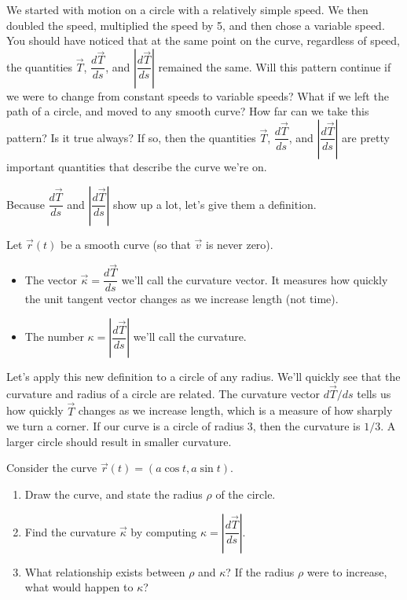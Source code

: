 We started with motion on a circle with a relatively simple speed.  We then doubled the speed, multiplied the speed by 5, and then chose a variable speed.  You should have noticed that at the same point on the curve, regardless of speed, the quantities $\vec T$, $\dfrac{d\vec T}{ds}$, and $\left|\dfrac{d\vec T}{ds}\right|$ remained the same. Will this pattern continue if we were to change from constant speeds to variable speeds?  What if we left the path of a circle, and moved to any smooth curve? How far can we take this pattern?  Is it true always?  If so, then the quantities $\vec T$, $\dfrac{d\vec T}{ds}$, and $\left|\dfrac{d\vec T}{ds}\right|$ are pretty important quantities that describe the curve we're on. 

Because $\dfrac{d\vec T}{ds}$ and $\left|\dfrac{d\vec T}{ds}\right|$ show up a lot, let's give them a definition.
\begin{definition}
 Let $\vec r(t)$ be a smooth curve (so that $\vec v$ is never zero).
\begin{itemize}
 \item The vector $\vec \kappa = \dfrac{d\vec T}{ds}$ we'll call the curvature vector. It measures how quickly the unit tangent vector changes as we increase length (not time).
 \item The number $\kappa = \left|\dfrac{d\vec T}{ds}\right|$ we'll call the curvature.
\end{itemize}
\end{definition}


Let's apply this new definition to a circle of any radius.  We'll quickly see that the curvature and radius of a circle are related.
The curvature vector $d\vec T/ds$ tells us how quickly $\vec T$ changes as we increase length, which is a measure of how sharply we turn a corner.  If our curve is a circle of radius $3$, then the curvature is $1/3$.  A larger circle should result in smaller curvature.  

\begin{problem}
 Consider the curve $\vec r(t)=(a\cos t, a\sin t)$.
 \begin{enumerate}
  \item Draw the curve, and state the radius $\rho$ of the circle.
  \item Find the curvature $\vec \kappa$ by computing $\kappa = \left|\dfrac{d\vec T}{ds}\right|$.
  \item What relationship exists between $\rho$ and $\kappa$?  If the radius $\rho$ were to increase, what would happen to $\kappa$?
 \end{enumerate}
\end{problem}

